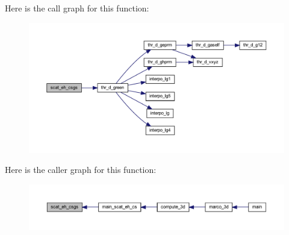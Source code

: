 Here is the call graph for this function\+:
\nopagebreak
\begin{figure}[H]
\begin{center}
\leavevmode
\includegraphics[width=350pt]{Marco_8f90_a343a057778b6701b550f9b257d626981_cgraph}
\end{center}
\end{figure}
Here is the caller graph for this function\+:
\nopagebreak
\begin{figure}[H]
\begin{center}
\leavevmode
\includegraphics[width=350pt]{Marco_8f90_a343a057778b6701b550f9b257d626981_icgraph}
\end{center}
\end{figure}
\mbox{\label{Marco_8f90_a5fc5c17c4de06fc14e3e7da23d14dbc0}} 

